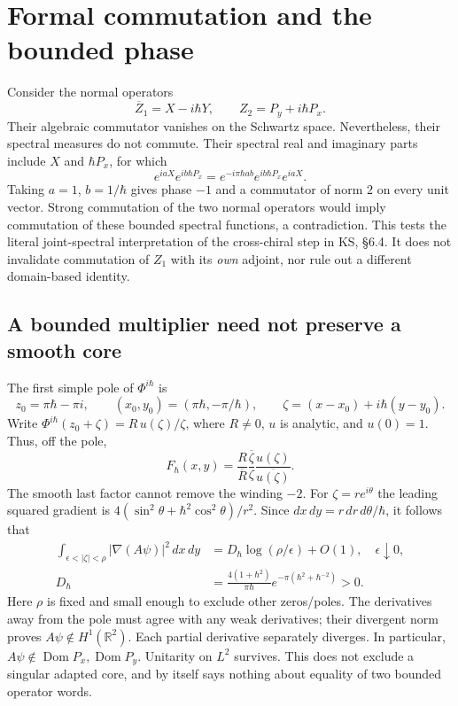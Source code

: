 \documentclass[11pt,a4paper]{article}
\newcommand{\Dom}{\operatorname{Dom}}
\begin{document}
\section{Formal commutation and the bounded phase}
Consider the normal operators
\[
 \overline Z_1=X-i\hbar Y,\qquad Z_2=P_y+i\hbar P_x.
\]
Their algebraic commutator vanishes on the Schwartz space. Nevertheless,
their spectral measures do not commute. Their spectral real and
imaginary parts include $X$ and $\hbar P_x$, for which
\[
 e^{iaX}e^{ib\hbar P_x}
   =e^{-i\pi\hbar ab}e^{ib\hbar P_x}e^{iaX}.
\]
Taking $a=1$, $b=1/\hbar$ gives phase $-1$ and a commutator of norm $2$
on every unit vector. Strong commutation of the two normal operators
would imply commutation of these bounded spectral functions, a contradiction.
This tests the literal joint-spectral interpretation of the cross-chiral
step in KS, \S6.4. It does not invalidate commutation of $Z_1$ with its
\emph{own} adjoint, nor rule out a different domain-based identity.

\subsection*{A bounded multiplier need not preserve a smooth core}
The first simple pole of $\Phi^{i\hbar}$ is
\[
 z_0=\pi\hbar-\pi i,\qquad
 (x_0,y_0)=(\pi\hbar,-\pi/\hbar),\qquad
 \zeta=(x-x_0)+i\hbar(y-y_0).
\]
Write $\Phi^{i\hbar}(z_0+\zeta)=R\,u(\zeta)/\zeta$,
where $R\ne0$, $u$ is analytic, and $u(0)=1$.
Thus, off the pole,
\[
 F_\hbar(x,y)=\frac{R}{\overline R}
       \frac{\overline\zeta}{\zeta}
       \frac{u(\zeta)}{\overline{u(\zeta)}}.
\]
The smooth last factor cannot remove the winding $-2$.
For $\zeta=r e^{i\theta}$ the leading squared gradient is
$4(\sin^2\theta+\hbar^2\cos^2\theta)/r^2$.
Since $dx\,dy=r\,dr\,d\theta/\hbar$, it follows that
\begin{align}
 \int_{\epsilon<|\zeta|<\rho}|\nabla(A\psi)|^2\,dx\,dy
 &=D_\hbar\log(\rho/\epsilon)+O(1),\quad \epsilon\downarrow0,\\
 D_\hbar&=\frac{4(1+\hbar^2)}{\pi\hbar}
       e^{-\pi(\hbar^2+\hbar^{-2})}>0 .
\end{align}
Here $\rho$ is fixed and small enough to exclude other zeros/poles.
The derivatives away from the pole must agree with any weak derivatives;
their divergent norm proves $A\psi\notin H^1(\mathbb R^2)$.
Each partial derivative separately diverges. In particular,
$A\psi\notin\Dom P_x,\Dom P_y$.
Unitarity on $L^2$ survives. This does not exclude a singular adapted core,
and by itself says nothing about equality of two bounded operator words.
\end{document}
